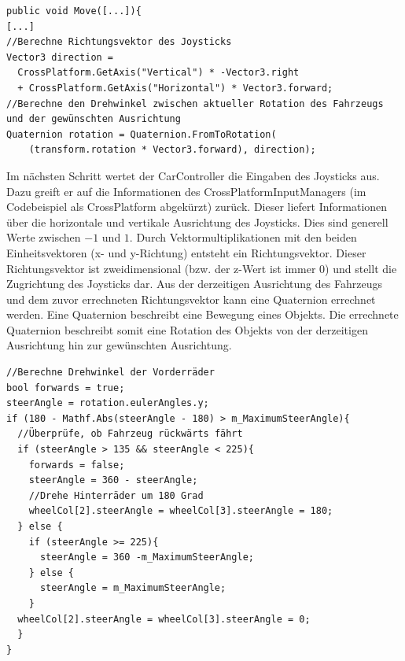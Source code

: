 	\begin{lstlisting}
public void Move([...]){
[...]
//Berechne Richtungsvektor des Joysticks
Vector3 direction =
  CrossPlatform.GetAxis("Vertical") * -Vector3.right
  + CrossPlatform.GetAxis("Horizontal") * Vector3.forward;
//Berechne den Drehwinkel zwischen aktueller Rotation des Fahrzeugs und der gewünschten Ausrichtung
Quaternion rotation = Quaternion.FromToRotation(
	(transform.rotation * Vector3.forward), direction);
	\end{lstlisting}

	Im nächsten Schritt wertet der CarController die Eingaben des Joysticks aus. Dazu greift er auf die Informationen des CrossPlatformInputManagers (im Codebeispiel als CrossPlatform abgekürzt) zurück. Dieser liefert Informationen über die horizontale und vertikale Ausrichtung des Joysticks. Dies sind generell Werte zwischen $-1$ und $1$. Durch Vektormultiplikationen mit den beiden Einheitsvektoren (x- und y-Richtung) entsteht ein Richtungsvektor. Dieser Richtungsvektor ist zweidimensional (bzw. der z-Wert ist immer $0$) und stellt die Zugrichtung des Joysticks dar.
	Aus der derzeitigen Ausrichtung des Fahrzeugs und dem zuvor errechneten Richtungsvektor kann eine Quaternion errechnet werden. Eine Quaternion beschreibt eine Bewegung eines Objekts. Die errechnete Quaternion beschreibt somit eine Rotation des Objekts von der derzeitigen Ausrichtung hin zur gewünschten Ausrichtung.

	\begin{lstlisting}
//Berechne Drehwinkel der Vorderräder
bool forwards = true;
steerAngle = rotation.eulerAngles.y;
if (180 - Mathf.Abs(steerAngle - 180) > m_MaximumSteerAngle){
  //Überprüfe, ob Fahrzeug rückwärts fährt
  if (steerAngle > 135 && steerAngle < 225){
	forwards = false;
	steerAngle = 360 - steerAngle;
	//Drehe Hinterräder um 180 Grad
	wheelCol[2].steerAngle = wheelCol[3].steerAngle = 180;
  } else {
    if (steerAngle >= 225){
	  steerAngle = 360 -m_MaximumSteerAngle;
    } else {
  	  steerAngle = m_MaximumSteerAngle;
    }
  wheelCol[2].steerAngle = wheelCol[3].steerAngle = 0;
  }
}
	\end{lstlisting}

